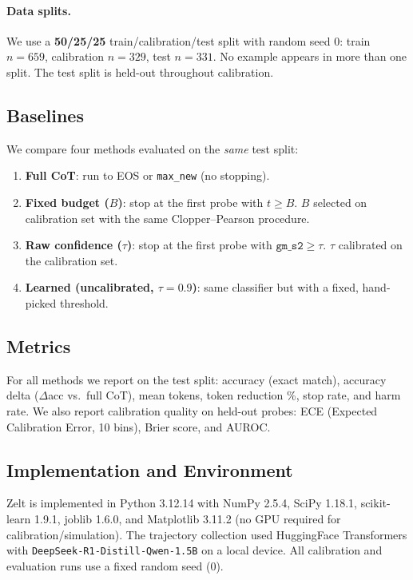 \documentclass[11pt]{article}
\begin{document}
\paragraph{Data splits.}
We use a \textbf{50/25/25} train/calibration/test split with
random seed 0:
train $n=659$, calibration $n=329$, test $n=331$.
No example appears in more than one split.
The test split is held-out throughout calibration.

\subsection{Baselines}

We compare four methods evaluated on the \emph{same} test split:
\begin{enumerate}
  \item \textbf{Full CoT}: run to EOS or \texttt{max\_new} (no stopping).
  \item \textbf{Fixed budget ($B$)}: stop at the first probe with
        $t \ge B$. $B$ selected on calibration set with the same
        Clopper--Pearson procedure.
  \item \textbf{Raw confidence ($\tau$)}: stop at the first probe with
        $\texttt{gm\_s2} \ge \tau$. $\tau$ calibrated on the calibration set.
  \item \textbf{Learned (uncalibrated, $\tau=0.9$)}: same classifier
        but with a fixed, hand-picked threshold.
\end{enumerate}

\subsection{Metrics}

For all methods we report on the test split:
accuracy (exact match), accuracy delta ($\Delta$acc vs.\ full CoT),
mean tokens, token reduction \%, stop rate, and harm rate.
We also report calibration quality on held-out probes:
ECE (Expected Calibration Error, 10 bins), Brier score, and AUROC.

\subsection{Implementation and Environment}

Zelt is implemented in Python 3.12.14 with
NumPy 2.5.4, SciPy 1.18.1, scikit-learn 1.9.1, joblib 1.6.0,
and Matplotlib 3.11.2 (no GPU required for calibration/simulation).
The trajectory collection used HuggingFace Transformers
with \texttt{DeepSeek-R1-Distill-Qwen-1.5B} on a local device.
All calibration and evaluation runs use a fixed random seed (0).
\end{document}
